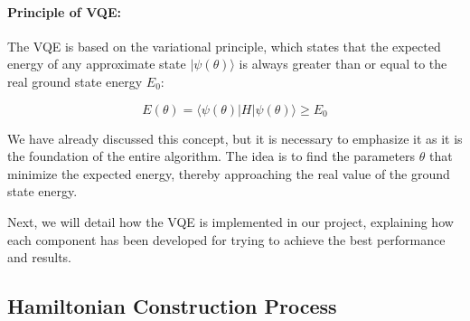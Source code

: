 \paragraph{Principle of VQE:}

The VQE is based on the variational principle, which states that the expected energy of any approximate state \( |\psi(\theta)\rangle \) is always greater than or equal to the real ground state energy \( E_0 \):

\[
E(\theta) = \langle \psi(\theta) | H | \psi(\theta) \rangle \geq E_0
\]

We have already discussed this concept, but it is necessary to emphasize it as it is the foundation of the entire algorithm. The idea is to find the parameters \( \theta \) that minimize the expected energy, thereby approaching the real value of the ground state energy.

\bigskip

Next, we will detail how the VQE is implemented in our project, explaining how each component has been developed for trying to achieve the best performance and results.
\subsection{Hamiltonian Construction Process}

